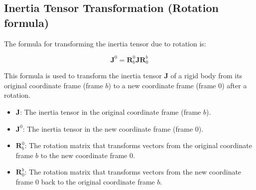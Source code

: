 \subsection{Inertia Tensor Transformation (Rotation formula)}

The formula for transforming the inertia tensor due to rotation is:

\[ \mathbf{J}^0 = \mathbf{R}^0_b \mathbf{J} \mathbf{R}^b_0 \]

This formula is used to transform the inertia tensor \(\mathbf{J}\) of a rigid body from its original coordinate frame (frame \(b\)) to a new coordinate frame (frame \(0\)) after a rotation.

\begin{itemize}
    \item \(\mathbf{J}\): The inertia tensor in the original coordinate frame (frame \(b\)).
    \item \(\mathbf{J}^0\): The inertia tensor in the new coordinate frame (frame \(0\)).
    \item \(\mathbf{R}^0_b\): The rotation matrix that transforms vectors from the original coordinate frame \(b\) to the new coordinate frame \(0\).
    \item \(\mathbf{R}^b_0\): The rotation matrix that transforms vectors from the new coordinate frame \(0\) back to the original coordinate frame \(b\). 
\end{itemize}



